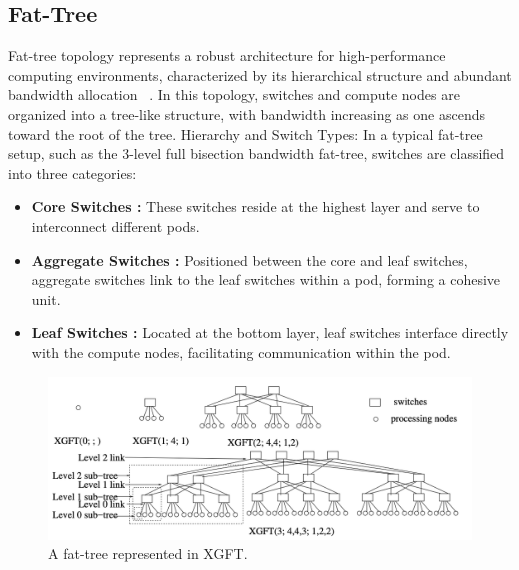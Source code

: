 \subsection{Fat-Tree} Fat-tree topology represents a robust architecture for
high-performance computing environments, characterized by its hierarchical
structure and abundant bandwidth allocation ~\cite{leiserson1985fat}. In this topology, switches and
compute nodes are organized into a tree-like structure, with bandwidth
increasing as one ascends toward the root of the tree.  Hierarchy and Switch
Types: In a typical fat-tree setup, such as the 3-level full bisection bandwidth
fat-tree, switches are classified into three categories: 

\begin{itemize} 
\item \textbf{Core Switches :} These switches reside at the highest layer and serve to interconnect different pods.
\item \textbf{Aggregate Switches :} Positioned between the core and leaf switches, aggregate switches link to the leaf switches within a pod, forming a cohesive unit.
\item \textbf{Leaf Switches :} Located at the bottom layer, leaf switches interface directly with the compute nodes, facilitating communication within the pod.
\end{itemize} 

\begin{figure}[h]
  \centering
  \includegraphics[width=0.8\columnwidth]{./figs/xgft.png}
  \caption{A fat-tree represented in XGFT.}
  \label{fig:fat-treexgft}
\end{figure}

